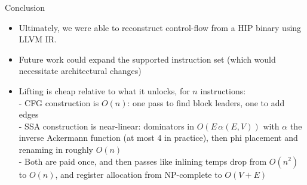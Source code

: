 \documentclass[10pt,aspectratio=169]{beamer}
\begin{document}
     \begin{frame}{Conclusion}
        \begin{itemize}
            \item Ultimately, we were able to reconstruct control-flow from a HIP binary using LLVM IR.
            \item Future work could expand the supported instruction set (which would necessitate architectural changes)
            \item Lifting is cheap relative to what it unlocks, for $n$ instructions:\\
                {\color{darkgray} \scriptsize{- CFG construction is $O(n)$: one pass to find block leaders, one to add edges}} \\
                {\color{darkgray} \scriptsize{- SSA construction is near-linear: dominators in $O(E\,\alpha(E,V))$ with $\alpha$ the inverse Ackermann function (at most 4 in practice), then phi placement and renaming in roughly $O(n)$}} \\
                {\color{darkgray} \scriptsize{- Both are paid once, and then passes like inlining temps drop from $O(n^2)$ to $O(n)$, and register allocation from NP-complete to $O(V+E)$}} \\
        \end{itemize}

	\end{frame}
\end{document}
